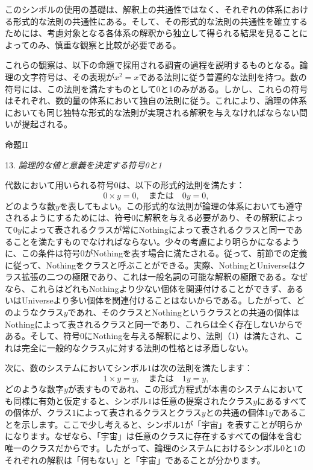\documentclass[a4paper,11pt,openany]{ltjsbook}
\begin{document}
このシンボルの使用の基礎は、解釈上の共通性ではなく、それぞれの体系における形式的な法則の共通性にある。そして、その形式的な法則の共通性を確立するためには、考慮対象となる各体系の解釈から独立して得られる結果を見ることによってのみ、慎重な観察と比較が必要である。

これらの観察は、以下の命題で採用される調査の過程を説明するものとなる。論理の文字符号は、その表現が$x^2 = x$である法則に従う普遍的な法則を持つ。数の符号には、この法則を満たすものとして0と1のみがある。しかし、これらの符号はそれぞれ、数的量の体系において独自の法則に従う。これにより、論理の体系においても同じ独特な形式的な法則が実現される解釈を与えなければならない問いが提起される。

\centerline{\textsc{命題II}}

13. \textit{論理的な値と意義を決定する符号0と1}

代数において用いられる符号0は、以下の形式的法則を満たす：
\begin{equation}
0 \times y = 0, \quad \textrm{または} \quad 0y = 0,
\end{equation}
どのような数$y$を表してもよい。この形式的な法則が論理の体系においても遵守されるようにするためには、符号0に解釈を与える必要があり、その解釈によって$0y$によって表されるクラスが常にNothingによって表されるクラスと同一であることを満たすものでなければならない。少々の考慮により明らかになるように、この条件は符号0がNothingを表す場合に満たされる。従って、前節での定義に従って、Nothingをクラスと呼ぶことができる。実際、NothingとUniverseはクラス拡張の二つの極限であり、これは一般名詞の可能な解釈の極限である。なぜなら、これらはどれもNothingより少ない個体を関連付けることができず、あるいはUniverseより多い個体を関連付けることはないからである。したがって、どのようなクラス$y$であれ、そのクラスとNothingというクラスとの共通の個体はNothingによって表されるクラスと同一であり、これらは全く存在しないからである。そして、符号0にNothingを与える解釈により、法則（1）は満たされ、これは完全に一般的なクラス$y$に対する法則の性格とは矛盾しない。

次に、数のシステムにおいてシンボル$1$は次の法則を満たします：
\[
1 \times y = y, \quad \text{または} \quad 1y = y,
\]
どのような数字$y$が表すものであれ、この形式方程式が本書のシステムにおいても同様に有効と仮定すると、シンボル$1$は任意の提案されたクラス$y$にあるすべての個体が、クラス$1$によって表されるクラスとクラス$y$との共通の個体$1y$であることを示します。ここで少し考えると、シンボル$1$が「宇宙」を表すことが明らかになります。なぜなら、「宇宙」は任意のクラスに存在するすべての個体を含む唯一のクラスだからです。したがって、論理のシステムにおけるシンボル$0$と$1$のそれぞれの解釈は「何もない」と「宇宙」であることが分かります。
\end{document}

